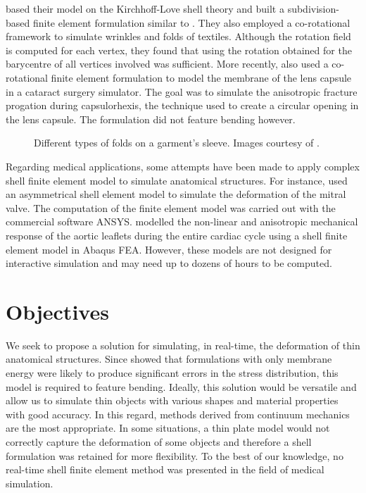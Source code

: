 \cite{Thomaszewski06} based their model on the Kirchhoff-Love shell theory and built a subdivision-based finite element formulation similar to \cite{Cirak00}.  They also employed a co-rotational framework to simulate wrinkles and folds of textiles. Although the rotation field is computed for each vertex, they found that using the rotation obtained for the barycentre of all vertices involved was sufficient. More recently, \cite{Allard09} also used a co-rotational finite element formulation to model the membrane of the lens capsule in a cataract surgery simulator. The goal was to simulate the anisotropic fracture progation during capsulorhexis, the technique used to create a circular opening in the lens capsule. The formulation did not feature bending however. 
%
\begin{figure}[ht]
\centering 
{}
\hfill 
{}
\hfill 
{}
\caption[Different types of folds on a garment's sleeve ]{Different types of folds on a garment's sleeve. Images courtesy of \cite{Thomaszewski06}.}
\label{chap7:fig-sheet}
\end{figure}

Regarding medical applications, some attempts have been made to apply complex shell finite element model to simulate anatomical structures. For instance, \cite{Lim05} used an asymmetrical shell element model to simulate the deformation of the mitral valve. The computation of the finite element model was carried out with the commercial software ANSYS. \cite{Conti10} modelled the non-linear and anisotropic mechanical response of the aortic leaflets during the entire cardiac cycle using a shell finite element model in Abaqus FEA. However, these models are not designed for interactive simulation and may need up to dozens of hours to be computed. 


\section{Objectives}

We seek to propose a solution for simulating, in real-time, the deformation of thin anatomical structures. Since \cite{Black91} showed that formulations with only membrane energy were likely to produce significant errors in the stress distribution, this model is required to feature bending. Ideally, this solution would be versatile and allow us to simulate thin objects with various shapes and material properties with good accuracy. In this regard, methods derived from continuum mechanics are the most appropriate. In some situations, a thin plate model would not correctly capture the deformation of some objects and therefore a shell formulation was retained for more flexibility. To the best of our knowledge, no real-time shell finite element method was presented in the field of medical simulation.  

